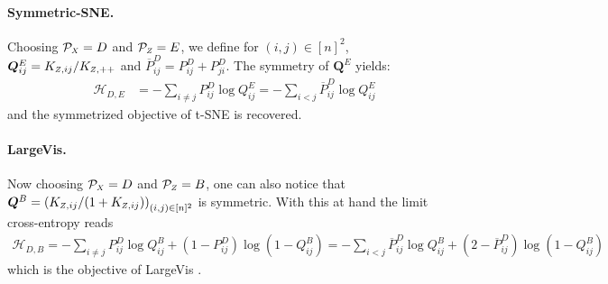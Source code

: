 \paragraph{Symmetric-SNE.}
Choosing $\mathcal{P}_{\scaleto{X}{4pt}} = D$ and $\mathcal{P}_{\scaleto{Z}{4pt}} = E$, we define for $(i,j) \in [n]^2$, $\bm{Q}^{E}_{ij} = K_{\scaleto{Z}{4pt},ij} / K_{\scaleto{Z}{4pt},++}$ and $\overline{P}^{D}_{ij} = P^{D}_{ij} + P^{D}_{ji}$. The symmetry of $\bm{Q}^{E}$ yields:
\begin{align*}
    \mathcal{H}_{D,E} &= - \sum_{i \neq j} P^{D}_{ij} \log Q^{E}_{ij} = - \sum_{i < j} \overline{P}^{D}_{ij} \log Q^{E}_{ij}
\end{align*}
and the symmetrized objective of t-SNE \cite{maaten2008tSNE} is recovered. 

\paragraph{LargeVis.}
Now choosing $\mathcal{P}_{\scaleto{X}{4pt}} = D$ and $\mathcal{P}_{\scaleto{Z}{4pt}} = B$, one can also notice that $\bm{Q}^{B} = \left( K_{\scaleto{Z}{4pt},ij} / (1+K_{\scaleto{Z}{4pt},ij}) \right)_{(i,j) \in [n]^2}$ is symmetric. With this at hand the limit cross-entropy reads
\begin{align*}
    \mathcal{H}_{D,B} = - \sum_{i \neq j} P^{D}_{ij} \log Q^{B}_{ij} + \left(1 - P^{D}_{ij} \right) \log\left(1-Q^{B}_{ij} \right)
    = - \sum_{i < j} \overline{P}^{D}_{ij} \log Q^{B}_{ij} + \left(2-\overline{P}^{D}_{ij}\right) \log (1- Q^{B}_{ij})
\end{align*}
which is the objective of LargeVis \cite{tang2016visualizing}.

